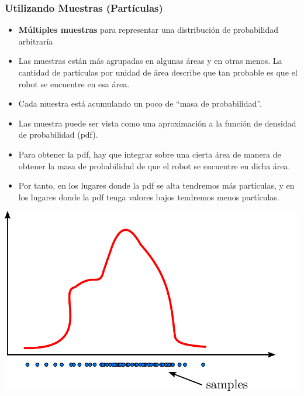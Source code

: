 \begin{frame}
    \frametitle{Utilizando Muestras (Partículas)}
    \footnotesize
    \begin{itemize}
        \item \textbf{Múltiples muestras} para representar una distribución de probabilidad arbitraría
        \item Las muestras están más agrupadas en algunas áreas y en otras menos. La cantidad de partículas por unidad de área describe que tan probable es que el robot se encuentre en esa área.
        \item Cada muestra está acumulando un poco de ``masa de probabilidad''.
        \item Las muestra puede ser vista como una aproximación a la función de densidad de probabilidad (pdf).
        \item Para obtener la pdf, hay que integrar sobre una cierta área de manera de obtener la masa de probabilidad de que el robot se encuentre en dicha área. 
        \item Por tanto, en los lugares donde la pdf se alta tendremos más partículas, y en los lugares donde la pdf tenga valores bajos tendremos menos partículas.
    \end{itemize}
    
    \begin{center}
    \includegraphics[width=0.5\columnwidth]{./images/particle_filter/arbitrary_distribution_samples.pdf}
    \end{center}
    
\end{frame}

